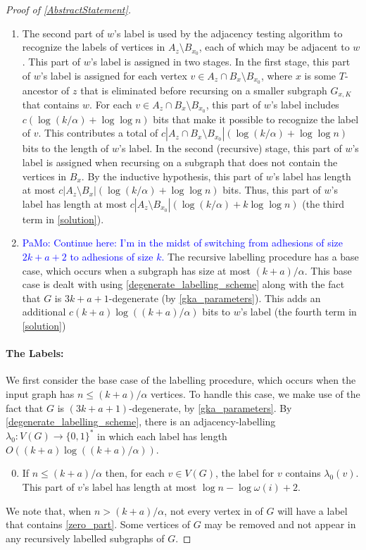 \documentclass{patmorin}
\renewcommand{\le}{\leqslant}
\newcommand{\pat}[1]{\textcolor{Blue}{PaMo: #1}}
\let\eqref\cref
\begin{document}
\begin{proof}[Proof of \cref{AbstractStatement}]
\begin{enumerate}
      \item The second part of $w$'s label is used by the adjacency testing algorithm to recognize the labels of vertices in $A_z\setminus B_{x_0}$, each of which may be adjacent to $w$. This part of $w$'s label is assigned in two stages. In the first stage, this part of $w$'s label is assigned for each vertex $v\in A_z\cap B_x\setminus B_{x_0}$, where $x$ is some $T$-ancestor of $z$ that is eliminated before recursing on a smaller subgraph $G_{x,K}$ that contains $w$.
      For each $v\in A_z\cap B_x\setminus B_{x_0}$, this part of $w$'s label includes $c(\log(k/\alpha)+\log\log n)$ bits that make it possible to recognize the label of $v$.  This contributes a total of $c|A_z\cap B_x\setminus B_{x_0}|(\log(k/\alpha)+\log\log n)$ bits to the length of $w$'s label.
      In the second (recursive) stage, this part of $w$'s label is assigned when recursing on a subgraph that does not contain the vertices in $B_x$. By the inductive hypothesis, this part of $w$'s label has length at most $c|A_z\setminus B_x|(\log(k/\alpha)+\log\log n)$ bits.  Thus, this part of $w$'s label has length at most $c|A_z\setminus B_{x_0}|(\log(k/\alpha)+k\log\log n)$ (the third term in \eqref{solution}).

      \item \pat{Continue here: I'm in the midst of switching from adhesions of size $2k+a+2$ to adhesions of size $k$.} The recursive labelling procedure has a base case, which occurs when a subgraph has size at most $(k+a)/\alpha$.  This base case is dealt with using \cref{degenerate_labelling_scheme} along with the fact that $G$ is $3k+a+1$-degenerate (by \cref{gka_parameters}). This adds an additional $c (k+a)\log((k+a)/\alpha)$ bits to $w$'s label (the fourth term in \eqref{solution})
    \end{enumerate}

    \paragraph{The Labels:}
    We first consider the base case of the labelling procedure, which occurs when the input graph has $n\le (k+a)/\alpha$ vertices. To handle this case, we make use of the fact that $G$ is $(3k+a+1)$-degenerate, by \cref{gka_parameters}. By \cref{degenerate_labelling_scheme}, there is an adjacency-labelling $\lambda_0:V(G)\to\{0,1\}^*$ in which each label has length $O((k+a)\log((k+a)/\alpha))$.

    \begin{enumerate}[nosep,nolistsep,label=(P\arabic*)]\setcounter{enumi}{-1}
      \item\label{zero_part} If $n\le (k+a)/\alpha$ then, for each $v\in V(G)$, the label for $v$ contains $\lambda_0(v)$.  This part of $v$'s label has length at most $\log n-\log\omega(i) + 2$.
    \end{enumerate}
    We note that, when $n>(k+a)/\alpha$, not every vertex in of $G$ will have a label that contains \ref{zero_part}. Some vertices of $G$ may be removed and not appear in any recursively labelled subgraphs of $G$.



\end{proof}
\end{document}
